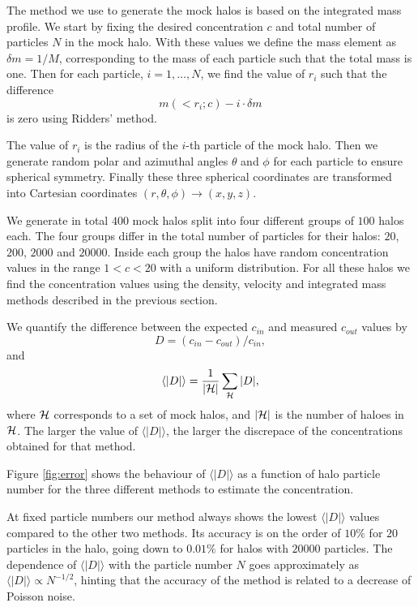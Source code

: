 \documentclass[a4,useAMS,usenatbib,usegraphicx]{mn2e}
\newcommand{\avg}[1]{\langle{#1}\rangle}
\begin{document}
The method we use to generate the mock halos is based on the
integrated mass profile.  
We start by fixing the desired concentration $c$ and total number of
particles $N$ in the mock halo.  
With these values we define the mass element as $\delta m = 1/M$, corresponding
to the mass of each particle such that the total mass is one.   
Then for each particle, $i=1,\ldots,N$, we find the value of $r_i$
such that the difference 
% 
\begin{equation}
m(<r_i;c) - i \cdot \delta m
\end{equation}
%
is zero using Ridders' method.

The value of $r_i$ is the radius of the $i$-th particle of the mock
halo.  
Then we generate random polar and azimuthal angles $\theta$ and
$\phi$ for each particle to ensure spherical symmetry.  
Finally these three spherical coordinates are transformed into
Cartesian coordinates $(r,\theta,\phi) \rightarrow (x,y,z)$.

We generate in total $400$ mock halos split into four different groups
of $100$ halos each.  The four groups differ in the total number of
particles for their halos: $20$, $200$, $2000$ and $20000$.  
Inside each group the halos have random concentration values in the range
$1<c<20$ with a uniform distribution.  
For all these halos we find  the concentration values using the
density, velocity and integrated mass methods described in the
previous section.   


We quantify the difference between the expected $c_{in}$ and measured
$c_{out}$ values by 
%
\begin{equation}
D=(c_{in}-c_{out})/c_{in},
\label{eq:D}
\end{equation}
%
and
%
\begin{equation}
\avg{|D|}=\frac{1}{\left|{\cal{H}}\right|}\sum_{{\cal{H}}} |D|,
\end{equation}
%
where ${\cal{H}}$ corresponds to a set of mock halos, and
$\left|{\cal{H}}\right|$ is the number of haloes in ${\cal{H}}$. 
  The larger the value of $\avg{|D|}$, the larger the discrepace of
  the concentrations obtained for that method.




Figure \ref{fig:error} shows the behaviour of $\avg{|D|}$ as a function of
halo particle number for the three different methods to estimate the
concentration.

At fixed particle numbers our method always shows the lowest
$\avg{|D|}$ values compared to the other two methods.  Its accuracy is
on the order of $10\%$ for $20$ particles in the halo, going down to
$0.01\%$ for halos with $20000$ particles.  The dependence of
$\avg{|D|}$ with the particle number $N$ goes approximately as
$\avg{|D|}\propto N^{-1/2}$, hinting that the accuracy of the method
is related to a decrease of Poisson noise.
\end{document}
